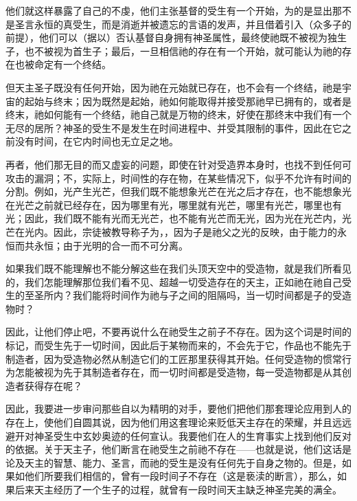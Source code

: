 他们就这样暴露了自己的不虔，他们主张基督的受生有一个开始，为的是显出那不是圣言永恒的真受生，而是消逝并被遗忘的言语的发声，并且借着引入（众多子的前提），他们可以（据以）否认基督自身拥有神圣属性，最终使祂既不被视为独生子，也不被视为首生子；最后，一旦相信祂的存在有一个开始，就可能认为祂的存在也被命定有一个终结。\par

但天主圣子既没有任何开始，因为祂在元始就已存在，也不会有一个终结，祂是宇宙的起始与终末；因为既然是起始，祂如何能取得并接受那祂早已拥有的，或者是终末，祂如何能有一个终结，祂自己就是万物的终末，好使在那终末中我们有一个无尽的居所？神圣的受生不是发生在时间进程中、并受其限制的事件，因此在它之前没有时间，在它内时间也无立足之地。\par

再者，他们那无目的而又虚妄的问题，即使在针对受造界本身时，也找不到任何可攻击的漏洞；不，实际上，时间性的存在物，在某些情况下，似乎不允许有时间的分割。例如，光产生光芒，但我们既不能想象光芒在光之后才存在，也不能想象光在光芒之前就已经存在，因为哪里有光，哪里就有光芒，哪里有光芒，哪里也有光；因此，我们既不能有光而无光芒，也不能有光芒而无光，因为光在光芒内，光芒在光内。因此，宗徒被教导称子为，，因为子是祂父之光的反映，由于能力的永恒而共永恒；由于光明的合一而不可分离。\par

如果我们既不能理解也不能分解这些在我们头顶天空中的受造物，就是我们所看见的，我们怎能理解那位我们看不见、超越一切受造存在的天主，正如祂在祂自己受生的至圣所内？我们能将时间作为祂与子之间的阻隔吗，当一切时间都是子的受造物时？\par

因此，让他们停止吧，不要再说什么在祂受生之前子不存在。因为这个词是时间的标记，而受生先于一切时间，因此后于某物而来的，不会先于它，作品也不能先于制造者，因为受造物必然从制造它们的工匠那里获得其开始。任何受造物的惯常行为怎能被视为先于其制造者存在，而一切时间都是受造物，每一受造物都是从其创造者获得存在呢？\par

因此，我要进一步审问那些自以为精明的对手，要他们把他们那套理论应用到人的存在上，使他们自圆其说，因为他们用这套理论来贬低天主存在的荣耀，并且远远避开对神圣受生中玄妙奥迹的任何宣认。我要他们在人的生育事实上找到他们反对的依据。关于天主子，他们断言在祂受生之前祂不存在——也就是说，他们这话是论及天主的智慧、能力、圣言，而祂的受生是没有任何先于自身之物的。但是，如果如他们所要我们相信的，曾有一段时间子不存在（这是亵渎的断言），那么，如果后来天主经历了一个生子的过程，就曾有一段时间天主缺乏神圣完美的满全。\par

